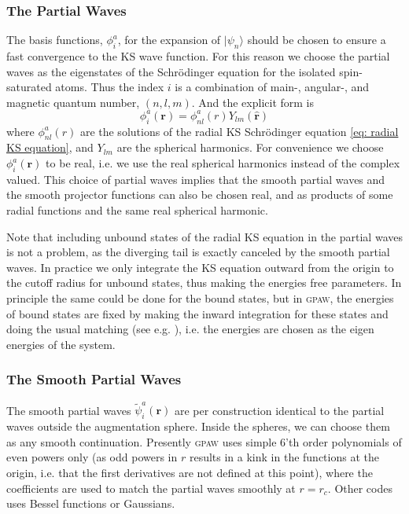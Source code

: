 \documentclass[a4paper]{article}
\newcommand{\gpaw}{\textsc{gpaw}}
\newcommand{\f}[1]{\mathbf{#1}}
\newcommand{\s}[1]{\tilde{#1}}
\newcommand{\br}{\mathbf{r}}
\newcommand{\ket}[1]{| #1 \rangle}
\begin{document}
\subsubsection*{The Partial Waves}
The basis functions, $\phi_i^a$, for the expansion of
$\ket{\psi_n}$ should be chosen to ensure a fast convergence to
the KS wave function. For this reason we choose the partial waves
as the eigenstates of the Schr{\"o}dinger equation for the isolated
spin-saturated atoms. Thus the index $i$ is a combination of
main-, angular-, and magnetic quantum number, $(n,l,m)$. And the
explicit form is
%
\begin{equation*}
\phi_i^a(\f{r})=\phi_{nl}^a(r)Y_{lm}(\hat{\f{r}})
\end{equation*}
%
where $\phi_{nl}^a(r)$ are the solutions of the radial KS Schr{\"o}dinger
equation \ref{eq: radial KS equation}, and $Y_{lm}$ are the
spherical harmonics. For convenience we choose $\phi_i^a(\f{r})$ to be
real, i.e. we use the real spherical harmonics instead of the complex
valued. This choice of partial waves implies that the smooth partial
waves and the smooth projector functions can also be chosen real, and
as products of some radial functions and the same real spherical
harmonic.
\par Note that including unbound states of the radial KS equation in
the partial waves is not a problem, as the diverging tail is exactly
canceled by the smooth partial waves. In practice we only integrate
the KS equation outward from the origin to the cutoff radius for
unbound states, thus making the energies free parameters. In principle
the same could be done for the bound states, but in \gpaw, the
energies of bound states are fixed by making the inward integration
for these states and doing the usual matching (see e.g. \cite[chapter
6]{Fiolhais2003}), i.e. the energies are chosen as the eigen energies
of the system.

\subsubsection*{The Smooth Partial Waves}
\par The smooth partial waves $\s{\psi}_i^a(\br)$ are per construction
identical to the partial waves outside the augmentation sphere. Inside
the spheres, we can choose them as any smooth continuation. Presently
\gpaw{} uses simple 6'th order polynomials of even powers only (as odd
powers in $r$ results in a kink in the functions at the origin, i.e.
that the first derivatives are not defined at this point), where the
coefficients are used to match the partial waves smoothly at $r=r_c$.
Other codes uses Bessel functions\cite{Kresse1999} or Gaussians.
\end{document}
